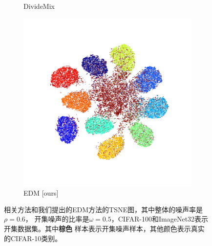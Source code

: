 \documentclass[12pt]{article}
\begin{document}
\begin{figure}[t]
\begin{subfigure}{.18\textwidth}
      \caption*{DivideMix~}
    \end{subfigure}
    \begin{subfigure}{.18\textwidth}
      \centering
      \includegraphics[width=\linewidth]{images/tsne/tsne_EDM_cifar100_D.png}
      \caption*{EDM [ours]}
    \end{subfigure}
    \caption{相关方法和我们提出的EDM方法的TSNE图，其中整体的噪声率是$\rho = 0.6$，
    开集噪声的比率是$\omega = 0.5$，CIFAR-100和ImageNet32表示开集数据集。其中\textbf{棕色}
    样本表示开集噪声样本，其他颜色表示真实的CIFAR-10类别。
    }
    \label{fig4}
\end{figure}
\end{document}
